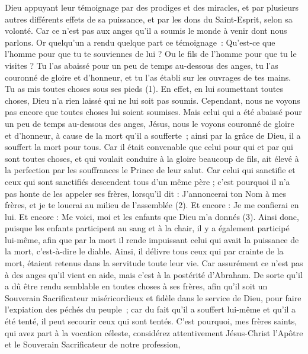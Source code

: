 \begin{multicols}{2}
Dieu appuyant leur témoignage par des prodiges et des miracles, et par plusieurs autres différents effets de sa puissance, et par les dons du Saint-Esprit, selon sa volonté.
Car ce n'est pas aux anges qu'il a soumis le monde à venir dont nous parlons.
Or quelqu'un a rendu quelque part ce témoignage : Qu'est-ce que l'homme pour que tu te souviennes de lui ? Ou le fils de l'homme pour que tu le visites ?
Tu l'as abaissé pour un peu de temps au-dessous des anges, tu l'as couronné de gloire et d'honneur, et tu l'as établi sur les ouvrages de tes mains.
Tu as mis toutes choses sous ses pieds (1). En effet, en lui soumettant toutes choses, Dieu n'a rien laissé qui ne lui soit pas soumis. Cependant, nous ne voyons pas encore que toutes choses lui soient soumises.
Mais celui qui a été abaissé pour un peu de temps au-dessous des anges, Jésus, nous le voyons couronné de gloire et d'honneur, à cause de la mort qu’il a soufferte ; ainsi par la grâce de Dieu, il a souffert la mort pour tous.
Car il était convenable que celui pour qui et par qui sont toutes choses, et qui voulait conduire à la gloire beaucoup de fils, ait élevé à la perfection par les souffrances le Prince de leur salut.
Car celui qui sanctifie et ceux qui sont sanctifiés descendent tous d'un même père ; c'est pourquoi il n’a pas honte de les appeler ses frères,
lorsqu’il dit : J'annoncerai ton Nom à mes frères, et je te louerai au milieu de l'assemblée (2).
Et encore : Je me confierai en lui. Et encore : Me voici, moi et les enfants que Dieu m'a donnés (3).
Ainsi donc, puisque les enfants participent au sang et à la chair, il y a également participé lui-même, afin que par la mort il rende impuissant celui qui avait la puissance de la mort, c'est-à-dire le diable.
Ainsi, il délivre tous ceux qui par crainte de la mort, étaient retenus dans la servitude toute leur vie.
Car assurément ce n’est pas à des anges qu’il vient en aide, mais c’est à la postérité d'Abraham.
De sorte qu’il a dû être rendu semblable en toutes choses à ses frères, afin qu'il soit un Souverain Sacrificateur miséricordieux et fidèle dans le service de Dieu, pour faire l’expiation des péchés du peuple ;
car du fait qu'il a souffert lui-même et qu’il a été tenté, il peut secourir ceux qui sont tentés.
\VerseOne{}C'est pourquoi, mes frères saints, qui avez part à la vocation céleste, considérez attentivement Jésus-Christ l'Apôtre et le Souverain Sacrificateur de notre profession,

\end{multicols}
